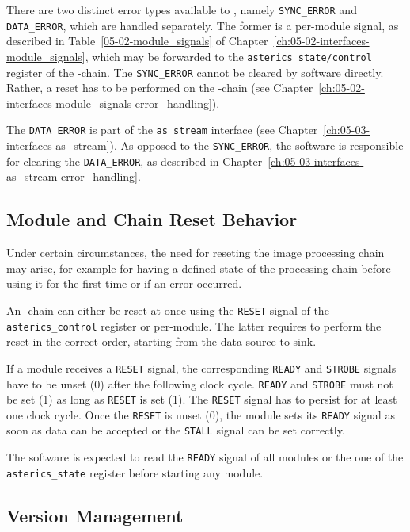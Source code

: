 There are two distinct error types available to \asterics, namely \texttt{SYNC\_ERROR} and \texttt{DATA\_ERROR}, which are handled separately.
The former is a per-module signal, as described in Table~\ref{05-02-module_signals} of Chapter~\ref{ch:05-02-interfaces-module_signals}, which may be forwarded to the \texttt{asterics\_state/control} register of the \asterics-chain.
The \texttt{SYNC\_ERROR} cannot be cleared by software directly. Rather, a reset has to be performed on the \asterics-chain (see Chapter~\ref{ch:05-02-interfaces-module_signals-error_handling}).
 
The \texttt{DATA\_ERROR} is part of the \texttt{as\_stream} interface (see Chapter~\ref{ch:05-03-interfaces-as_stream}).
As opposed to the \texttt{SYNC\_ERROR}, the software is responsible for clearing the \texttt{DATA\_ERROR}, as described in Chapter~\ref{ch:05-03-interfaces-as_stream-error_handling}.


\subsection{Module and Chain Reset Behavior}

Under certain circumstances, the need for reseting the \asterics image processing chain may arise, for example for having a defined state of the processing chain before using it for the first time or if an error occurred.

An \asterics-chain can either be reset at once using the \texttt{RESET} signal of the \texttt{asterics\_control} register or per-module.
The latter requires to perform the reset in the correct order, starting from the data source to sink.

If a module receives a \texttt{RESET} signal, the corresponding \texttt{READY} and \texttt{STROBE} signals have to be unset (0) after the following clock cycle.
\texttt{READY} and \texttt{STROBE} must not be set (1) as long as \texttt{RESET} is set (1).
The \texttt{RESET} signal has to persist for at least one clock cycle.
Once the \texttt{RESET} is unset (0), the module sets its \texttt{READY} signal as soon as data can be accepted or the \texttt{STALL} signal can be set correctly.

The software is expected to read the \texttt{READY} signal of all modules or the one of the \texttt{asterics\_state} register before starting any module.

\subsection{Version Management}

